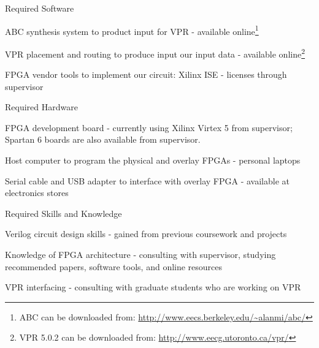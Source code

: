 \begin{itemlist}
	\item Required Software \
		\begin{itemlist}
			\item ABC synthesis system to product input for VPR - available online\footnote{ABC can be downloaded from: \url{http://www.eecs.berkeley.edu/~alanmi/abc/}}
			\item VPR placement and routing to produce input our input data - available online\footnote{VPR 5.0.2 can be downloaded from: \url{http://www.eecg.utoronto.ca/vpr/}}
			\item FPGA vendor tools to implement our circuit: Xilinx ISE - licenses through supervisor
		\end{itemlist}
	\item Required Hardware \
		\begin{itemlist}
			\item FPGA development board - currently using Xilinx Virtex 5 from supervisor; Spartan 6 boards are also available from supervisor.
			\item Host computer to program the physical and overlay FPGAs - personal laptops
			\item Serial cable and USB adapter to interface with overlay FPGA - available at electronics stores
		\end{itemlist}
	\item Required Skills and Knowledge \
		\begin{itemlist}
			\item Verilog circuit design skills - gained from previous coursework and projects
			\item Knowledge of FPGA architecture - consulting with supervisor, studying recommended papers, software tools, and online resources
			\item VPR interfacing - consulting with graduate students who are working on VPR
		\end{itemlist}
\end{itemlist}


